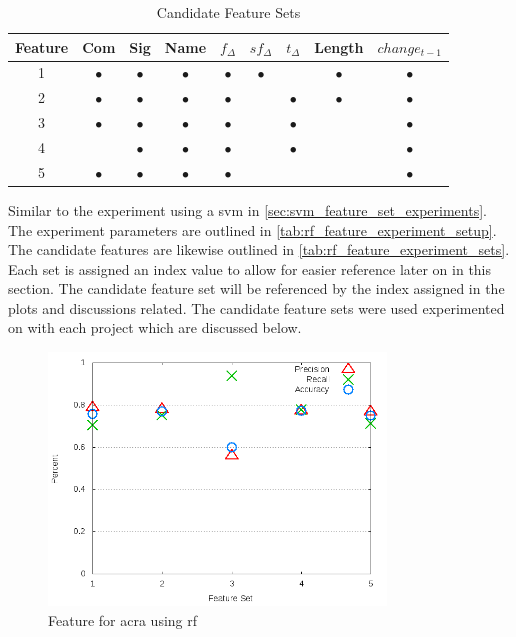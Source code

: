 \begin{table}[h]
\begin{center}

    \begin{tabular}{|c|c|c|c|c|c|c|c|c|}
        \hline
        Feature & Com & Sig & Name & $f_{\Delta}$ & $sf_{\Delta}$ & $t_\Delta$ & Length & $change_{t-1}$ \\
         \hline
        1 & $\bullet$ & $\bullet$ & $\bullet$ & $\bullet$ & $\bullet$ & & $\bullet$ & $\bullet$ \\
        2 & $\bullet$ & $\bullet$ & $\bullet$ & $\bullet$ & & $\bullet$ & $\bullet$ & $\bullet$ \\
        3 & $\bullet$ & $\bullet$ & $\bullet$ & $\bullet$ & & $\bullet$ & & $\bullet$ \\
        4 & & $\bullet$ & $\bullet$ & $\bullet$ & & $\bullet$ & & $\bullet$ \\
        5 & $\bullet$ & $\bullet$ & $\bullet$ & $\bullet$ & & & & $\bullet$ \\ \hline
    \end{tabular}
    \caption{Candidate Feature Sets}
    \label{tab:rf_feature_experiment_sets}
\end{center}

\end{table}

Similar to the experiment using a \gls{svm} in \autoref{sec:svm_feature_set_experiments}. The experiment parameters are outlined in \autoref{tab:rf_feature_experiment_setup}. The candidate features are likewise outlined in \autoref{tab:rf_feature_experiment_sets}. Each set is assigned an index value to allow for easier reference later on in this section. The candidate feature set will be referenced by the index assigned in the plots and discussions related. The candidate feature sets were used experimented on with each project which are discussed below.

\begin{figure}[!t]
    \centering
        \includegraphics[width=0.8\textwidth]{images/rf/test_3/acra_sample_range}
        \caption{Feature for acra using \gls{rf}}
        \label{fig:test_3_acra_rf}
\end{figure}

